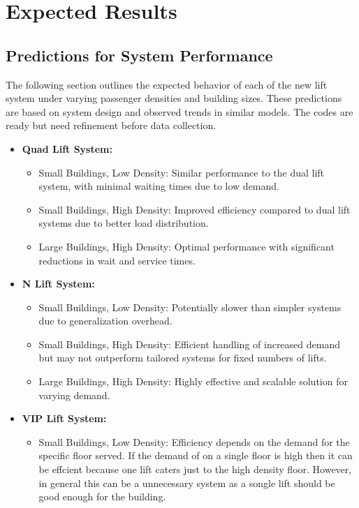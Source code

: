 \documentclass[12pt,a4paper]{report}
\begin{document}
\chapter{Expected Results}
\section{Predictions for System Performance}
The following section outlines the expected behavior of each of the new lift system under varying passenger densities and building sizes. These predictions are based on system design and observed trends in similar models. The codes are ready but need refinement before data collection.

\begin{itemize}
    \item \textbf{Quad Lift System:}
    \begin{itemize}
        \item Small Buildings, Low Density: Similar performance to the dual lift system, with minimal waiting times due to low demand.
        \item Small Buildings, High Density: Improved efficiency compared to dual lift systems due to better load distribution.
        \item Large Buildings, High Density: Optimal performance with significant reductions in wait and service times.
    \end{itemize}
    \item \textbf{N Lift System:}
    \begin{itemize}
        \item Small Buildings, Low Density: Potentially slower than simpler systems due to generalization overhead.
        \item Small Buildings, High Density: Efficient handling of increased demand but may not outperform tailored systems for fixed numbers of lifts.
        \item Large Buildings, High Density: Highly effective and scalable solution for varying demand.
    \end{itemize}
    \item \textbf{VIP Lift System:}
    \begin{itemize}
        \item Small Buildings, Low Density: Efficiency depends on the demand for the specific floor served. If the demand of on a single floor is high then it can be effcient because one lift caters just to the high density floor. However, in general this can be a unnecessary system as a songle lift should be good enough for the building.

\end{itemize}
\end{itemize}
\end{document}
